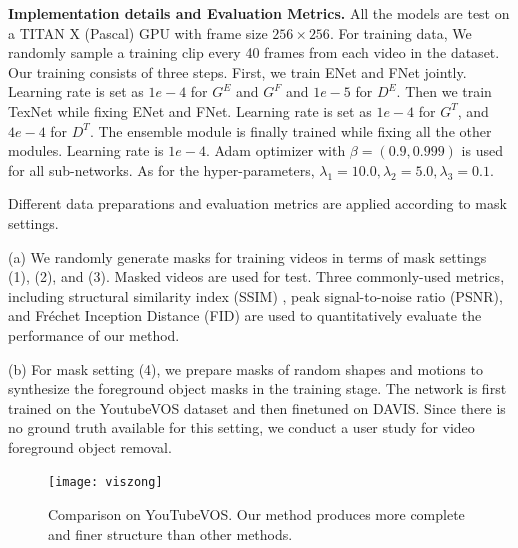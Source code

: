 \noindent \textbf{Implementation details and Evaluation Metrics.} 
All the models are test on a TITAN X (Pascal) GPU with frame size $256 \times 256$.
For training data, We randomly sample a training clip every 40 frames from each video in the dataset. Our training consists of three steps. First, we train ENet and FNet jointly. Learning rate is set as $1e-4$ for $G^E$ and $G^F$ and $1e-5$ for $D^E$. 
Then we train TexNet while fixing ENet and FNet. Learning rate is set as $1e-4$ for $G^T$, and $4e-4$ for $D^T$.
The ensemble module is finally trained while fixing all the other modules. Learning rate is $1e-4$.
Adam optimizer with $\beta=(0.9, 0.999)$ is used for all sub-networks.
As for the hyper-parameters, $\lambda_1=10.0,\lambda_2=5.0, \lambda_3=0.1$.

Different data preparations and evaluation metrics are applied according to mask settings.

\noindent (a) We randomly generate masks for training videos in terms of mask settings (1), (2), and (3). Masked videos are used for test.
Three commonly-used metrics, including structural similarity index (SSIM) \cite{wang2004image}, peak signal-to-noise ratio (PSNR), and Fr{\'e}chet Inception Distance (FID) \cite{heusel2017gans} are used to quantitatively evaluate the performance of our method. 

\noindent (b) For mask setting (4), we prepare masks of random shapes and motions to synthesize the foreground object masks in the training stage. The network is first trained on the YoutubeVOS dataset and then finetuned on DAVIS. Since there is no ground truth available for this setting, we conduct a user study for video foreground object removal.  

 
 
  

 
\begin{figure}[t]
	\centering
	\texttt{[image: viszong]} %
	\caption{Comparison on YouTubeVOS.  Our method produces more complete and finer structure than other methods.  }
	\label{viszong}
\end{figure}


